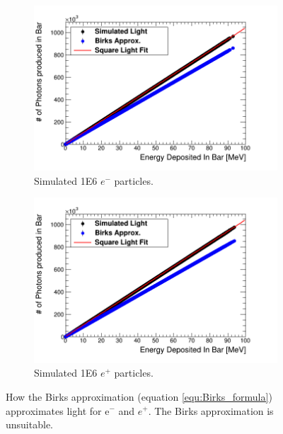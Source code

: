\begin{figure}[htbp]
\centering
\begin{subfigure}{.5\textwidth}
  \centering
  \includegraphics[width=\linewidth]{Appendix5/newFigs/e-BirksSlab_simAndApproxLight.png}
  \captionsetup{width=.9\linewidth}
  \caption{Simulated 1E6 $e^-$ particles.}
  \label{subfig:append5_light_of_electrons0-100mev}
\end{subfigure}%
\begin{subfigure}{.5\textwidth}
  \centering
  \includegraphics[width=\linewidth]{Appendix5/newFigs/e+BirksSlab_simAndApproxLight.png}
  \captionsetup{width=.9\linewidth}
  \caption{Simulated 1E6 $e^+$ particles.}
  \label{subfig:append5_light_of_positrons0-100mev}
\end{subfigure}
\caption{How the Birks approximation (equation \ref{equ:Birks_formula}) approximates light for e$^-$ and $e^+$. The Birks approximation is unsuitable.}
\label{fig:append5_light_of_electrons_positrons0-100mev}
\end{figure}

